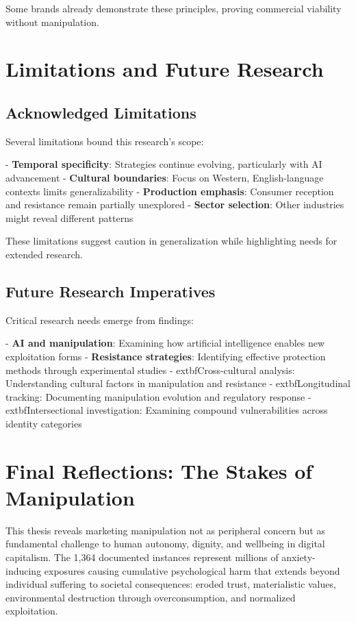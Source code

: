 Some brands already demonstrate these principles, proving commercial viability without manipulation.

\section{Limitations and Future Research}
\label{sec:limitations_future_conclusion}

\subsection{Acknowledged Limitations}

Several limitations bound this research's scope:

- \textbf{Temporal specificity}: Strategies continue evolving, particularly with AI advancement
- \textbf{Cultural boundaries}: Focus on Western, English-language contexts limits generalizability
- \textbf{Production emphasis}: Consumer reception and resistance remain partially unexplored
- \textbf{Sector selection}: Other industries might reveal different patterns

These limitations suggest caution in generalization while highlighting needs for extended research.

\subsection{Future Research Imperatives}

Critical research needs emerge from findings:

- \textbf{AI and manipulation}: Examining how artificial intelligence enables new exploitation forms
- \textbf{Resistance strategies}: Identifying effective protection methods through experimental studies
- 	extbf{Cross-cultural analysis}: Understanding cultural factors in manipulation and resistance
- 	extbf{Longitudinal tracking}: Documenting manipulation evolution and regulatory response
- 	extbf{Intersectional investigation}: Examining compound vulnerabilities across identity categories

\section{Final Reflections: The Stakes of Manipulation}
\label{sec:final_reflections}

This thesis reveals marketing manipulation not as peripheral concern but as fundamental challenge to human autonomy, dignity, and wellbeing in digital capitalism. The 1,364 documented instances represent millions of anxiety-inducing exposures causing cumulative psychological harm that extends beyond individual suffering to societal consequences: eroded trust, materialistic values, environmental destruction through overconsumption, and normalized exploitation.

